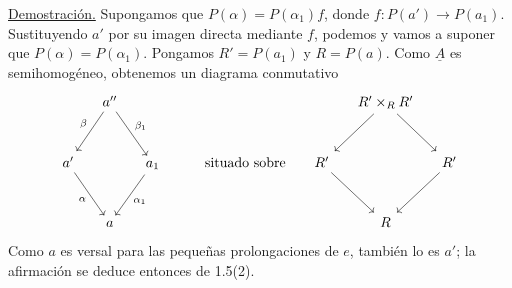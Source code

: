 \underline{Demostración.} Supongamos que
$P(\alpha)=P(\alpha_1)f$, donde
$f:P(a')\longrightarrow P(a_1)$. Sustituyendo $a'$ por su imagen
directa mediante $f$, podemos y vamos a suponer que
$P(\alpha)=P(\alpha_1)$. Pongamos $R'=P(a_1)$ y $R=P(a)$. Como
$\underline A$ es semihomogéneo, obtenemos un diagrama conmutativo
\[
\begin{tikzcd}[row sep=large,column sep=small]
& a'' \arrow[dl,"\beta"'] \arrow[dr,"\beta_1"]
  & & & & & R'\times_RR' \arrow[dl] \arrow[dr] & \\
a' \arrow[dr,"\alpha"'] & & a_1 \arrow[dl,"\alpha_1"]
  & & \text{situado sobre} & R' \arrow[dr] & & R' \arrow[dl] \\
& a & & & & & R &
\end{tikzcd}
\]
Como $a$ es versal para las pequeñas prolongaciones de $e$, también lo
es $a'$; la afirmación se deduce entonces de 1.5(2).
